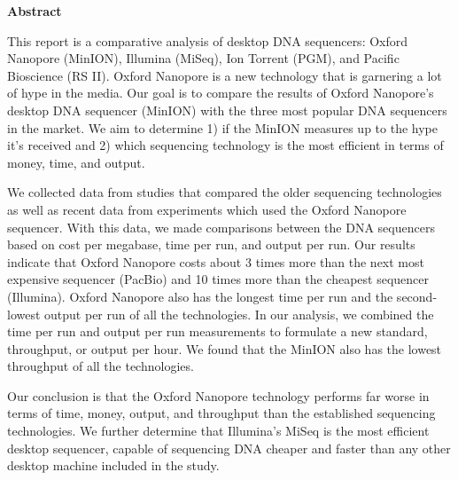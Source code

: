 \documentclass[12pt,letterpaper]{report}
\renewcommand{\thepage}{\roman{page}}%
\begin{document}

\listoffigures
\begingroup
\let\clearpage\relax
{}
\listoftables
\endgroup
\clearpage


\begin{center}
\Huge\textbf{Abstract}
\end{center}
This report is a comparative analysis of desktop DNA sequencers: Oxford Nanopore (MinION), Illumina (MiSeq), Ion Torrent (PGM), and Pacific Bioscience (RS II). Oxford Nanopore is a new technology that is garnering a lot of hype in the media. Our goal is to compare the results of Oxford Nanopore's desktop DNA sequencer (MinION) with the three most popular DNA sequencers in the market. We aim to determine 1) if the MinION measures up to the hype it's received and 2) which sequencing technology is the most efficient in terms of money, time, and output. 

We collected data from studies that compared the older sequencing technologies as well as recent data from experiments which used the Oxford Nanopore sequencer. With this data, we made comparisons between the DNA sequencers based on cost per megabase, time per run, and output per run. Our results indicate that Oxford Nanopore costs about 3 times more than the next most expensive sequencer (PacBio) and 10 times more than the cheapest sequencer (Illumina). Oxford Nanopore also has the longest time per run and the second-lowest output per run of all the technologies. In our analysis, we combined the time per run and output per run measurements to formulate a new standard, throughput, or output per hour. We found that the MinION also has the lowest throughput of all the technologies. 

Our conclusion is that the Oxford Nanopore technology performs far worse in terms of time, money, output, and throughput than the established sequencing technologies. We further determine that Illumina's MiSeq is the most efficient desktop sequencer, capable of sequencing DNA cheaper and faster than any other desktop machine included in the study.

\clearpage

\setcounter{page}{1}
\renewcommand{\thepage}{\arabic{page}}%
\end{document}
